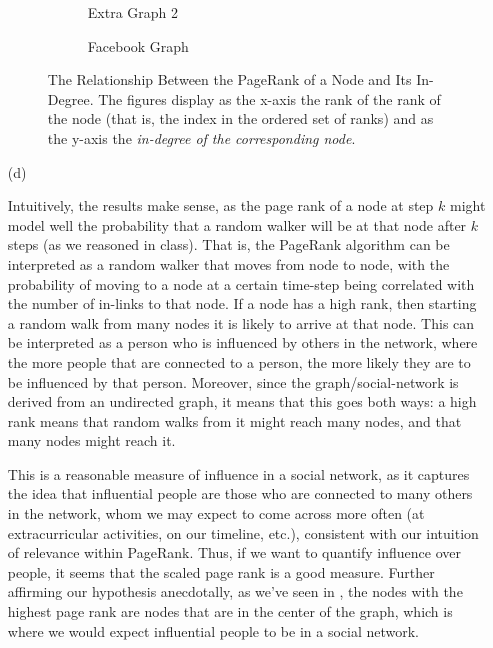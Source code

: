 \documentclass{article}
\begin{document}
\begin{enumerate}
\begin{figure}
        \begin{subfigure}[t]{0.45\textwidth}
            \centering
            \resizebox{\textwidth}{!}{%
                
            }
            \caption{Extra Graph 2}
        \end{subfigure}
        \hfill
        \begin{subfigure}[t]{0.45\textwidth}
            \centering
            \resizebox{\textwidth}{!}{%
                
            }
            \caption{Facebook Graph}
        \end{subfigure}
        \caption{The Relationship Between the PageRank of a Node and Its In-Degree. The figures display as the x-axis the rank of the rank of the node (that is, the index in the ordered set of ranks) and as the y-axis the \textit{in-degree of the corresponding node}.}
        \label{fig:inlink_analysis}
    \end{figure}

    \pagebreak

    \item[(d)] 
    
    Intuitively, the results make sense, as the page rank of a node at step $k$ might model well the probability that a random walker will be at that node after $k$ steps (as we reasoned in class). That is, the PageRank algorithm can be interpreted as a random walker that moves from node to node, with the probability of moving to a node at a certain time-step being correlated with the number of in-links to that node. If a node has a high rank, then starting a random walk from many nodes it is likely to arrive at that node. This can be interpreted as a person who is influenced by others in the network, where the more people that are connected to a person, the more likely they are to be influenced by that person. Moreover, since the graph/social-network is derived from an undirected graph, it means that this goes both ways: a high rank means that random walks from it might reach many nodes, and that many nodes might reach it.
    
    This is a reasonable measure of influence in a social network, as it captures the idea that influential people are those who are connected to many others in the network, whom we may expect to come across more often (at extracurricular activities, on our timeline, etc.), consistent with our intuition of relevance within PageRank. Thus, if we want to quantify influence over people, it seems that the scaled page rank is a good measure. Further affirming our hypothesis anecdotally, as we've seen in , the nodes with the highest page rank are nodes that are in the center of the graph, which is where we would expect influential people to be in a social network.


\end{enumerate}
\end{document}
